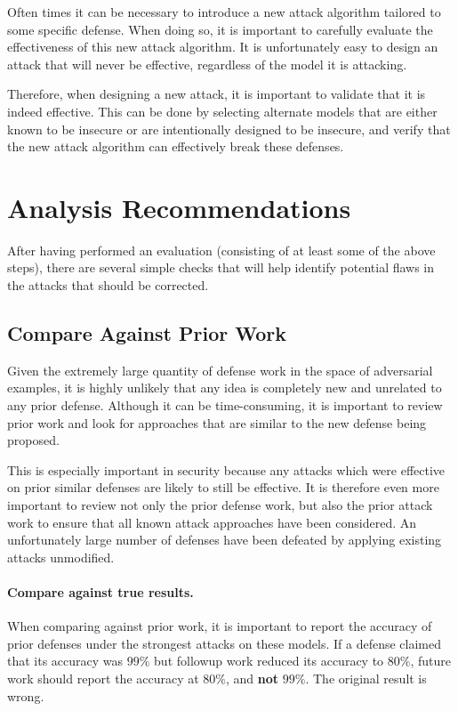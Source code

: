 \documentclass{article} %
\begin{document}
Often times it can be necessary to introduce a new attack algorithm
tailored to some specific defense.
%
When doing so, it is important
to carefully evaluate the effectiveness of this new attack algorithm.
%
It is unfortunately
easy to design an attack that will never be effective, regardless
of the model it is attacking.

Therefore, when designing a new attack, it is important to validate
that it is indeed effective.
%
This can be done by selecting alternate
models that are either known to be insecure or are intentionally
designed to be insecure, and verify that the new attack algorithm
can effectively break these defenses.


\section{Analysis Recommendations}
\label{sec:analysis}

After having performed an evaluation (consisting of at least 
some of the above
steps), there are several simple checks that will help
identify potential flaws in the attacks that should be corrected.

\subsection{Compare Against Prior Work}
\label{sec:priorwork}

Given the extremely large quantity of defense work in the space of
adversarial examples, it is highly unlikely that any idea is completely
new and unrelated to any prior defense.
%
Although it can be time-consuming, it is important to review prior
work and look for approaches that are similar to the new defense
being proposed.

This is especially important in security because any attacks which
were effective on prior similar defenses are likely to still
be effective.
%
It is therefore even more important to review not
only the prior defense work, but also the prior attack work to ensure
that all known attack approaches have been considered.
%
An unfortunately large number of defenses have been defeated by
applying existing attacks unmodified.

\paragraph{Compare against true results.}
%
When comparing against prior
work, it is important to report the accuracy of prior defenses under
the strongest attacks on these models.%
If a defense claimed that its
accuracy was $99\%$ but followup work reduced its accuracy to $80\%$,
future work should report the accuracy at $80\%$, and \textbf{not} $99\%$.
%
The original result is wrong.
\end{document}
